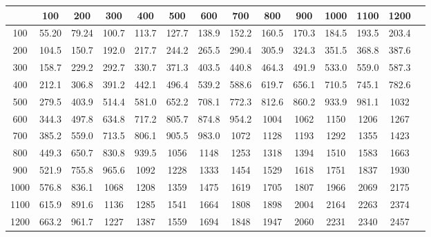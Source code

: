 \begin{tabular}{|c|c|c|c|c|c|c|c|c|c|c|c|c|c|}
\hline 
 & 100 & 200 & 300 & 400 & 500 & 600 & 700 & 800 & 900 & 1000 & 1100 & 1200\\ 
\hline 
100 & 55.20 & 79.24 & 100.7 & 113.7 & 127.7 & 138.9 & 152.2 & 160.5 & 170.3 & 184.5 & 193.5 & 203.4\\ 
\hline 
200 & 104.5 & 150.7 & 192.0 & 217.7 & 244.2 & 265.5 & 290.4 & 305.9 & 324.3 & 351.5 & 368.8 & 387.6\\ 
\hline 
300 & 158.7 & 229.2 & 292.7 & 330.7 & 371.3 & 403.5 & 440.8 & 464.3 & 491.9 & 533.0 & 559.0 & 587.3\\ 
\hline 
400 & 212.1 & 306.8 & 391.2 & 442.1 & 496.4 & 539.2 & 588.6 & 619.7 & 656.1 & 710.5 & 745.1 & 782.6\\ 
\hline 
500 & 279.5 & 403.9 & 514.4 & 581.0 & 652.2 & 708.1 & 772.3 & 812.6 & 860.2 & 933.9 & 981.1 & 1032\\ 
\hline 
600 & 344.3 & 497.8 & 634.8 & 717.2 & 805.7 & 874.8 & 954.2 & 1004 & 1062 & 1150 & 1206 & 1267\\ 
\hline 
700 & 385.2 & 559.0 & 713.5 & 806.1 & 905.5 & 983.0 & 1072 & 1128 & 1193 & 1292 & 1355 & 1423\\ 
\hline 
800 & 449.3 & 650.7 & 830.8 & 939.5 & 1056 & 1148 & 1253 & 1318 & 1394 & 1510 & 1583 & 1663\\ 
\hline 
900 & 521.9 & 755.8 & 965.6 & 1092 & 1228 & 1333 & 1454 & 1529 & 1618 & 1751 & 1837 & 1930\\ 
\hline 
1000 & 576.8 & 836.1 & 1068 & 1208 & 1359 & 1475 & 1619 & 1705 & 1807 & 1966 & 2069 & 2175\\ 
\hline 
1100 & 615.9 & 891.6 & 1136 & 1285 & 1541 & 1664 & 1808 & 1898 & 2004 & 2164 & 2263 & 2374\\ 
\hline 
1200 & 663.2 & 961.7 & 1227 & 1387 & 1559 & 1694 & 1848 & 1947 & 2060 & 2231 & 2340 & 2457\\ 
\hline 
\end{tabular}